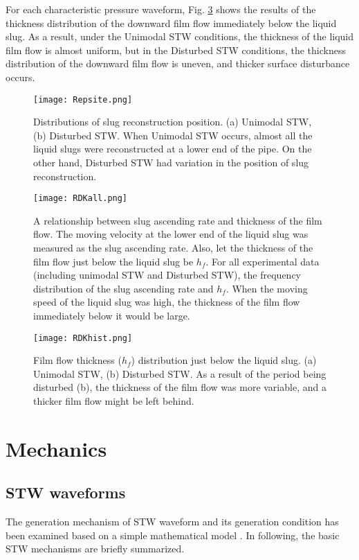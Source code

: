 \documentclass[aps,pre,preprint,groupedaddress,showkeys]{revtex4-2}
\begin{document}
For each characteristic pressure waveform, Fig. \ref{RDKhist} shows the results of the thickness distribution of the downward film flow immediately below the liquid slug.
As a result, under the Unimodal STW conditions, the thickness of the liquid film flow is almost uniform, but in the Disturbed STW conditions, the thickness distribution of the downward film flow is uneven, and thicker surface disturbance occurs.

\begin{figure}
\texttt{[image: Repsite.png]} 
\caption{\label{Repsite}Distributions of slug reconstruction position. (a) Unimodal STW, (b) Disturbed STW. When Unimodal STW occurs, almost all the liquid slugs were reconstructed at a lower end of the pipe.
On the other hand, Disturbed STW had variation in the position of slug reconstruction.}
\end{figure} 

\begin{figure}
\texttt{[image: RDKall.png]} 
\caption{\label{RDKall}A relationship between slug ascending rate and thickness of the film flow.
The moving velocity at the lower end of the liquid slug was measured as the slug ascending rate.
Also, let the thickness of the film flow just below the liquid slug be $ h_f $.
For all experimental data (including unimodal STW and Disturbed STW), the frequency distribution of the slug ascending rate and $ h_f $.
When the moving speed of the liquid slug was high, the thickness of the film flow immediately below it would be large.}
\end{figure} 


\begin{figure}
\texttt{[image: RDKhist.png]} 
\caption{\label{RDKhist}Film flow thickness ($ h_f $) distribution just below the liquid slug.
(a) Unimodal STW, (b) Disturbed STW.
As a result of the period being disturbed (b), the thickness of the film flow was more variable, and a thicker film flow might be left behind.}
\end{figure} 

\section{Mechanics}\label{mec}
\subsection{STW waveforms}
The generation mechanism of STW waveform and its generation condition has been examined based on a simple mathematical model \citep{kanno2018}.
In following, the basic STW mechanisms are briefly summarized.
\end{document}

